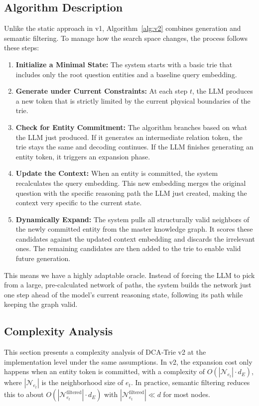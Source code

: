 \subsection{Algorithm Description}

Unlike the static approach in v1, Algorithm~\ref{alg:v2} combines generation and semantic filtering. To manage how the search space changes, the process follows these steps:

\begin{enumerate}
  \item \textbf{Initialize a Minimal State:} The system starts with a basic trie that includes only the root question entities and a baseline query embedding.
  \item \textbf{Generate under Current Constraints:} At each step $t$, the LLM produces a new token that is strictly limited by the current physical boundaries of the trie.
  \item \textbf{Check for Entity Commitment:} The algorithm branches based on what the LLM just produced. If it generates an intermediate relation token, the trie stays the same and decoding continues. If the LLM finishes generating an entity token, it triggers an expansion phase.
  \item \textbf{Update the Context:} When an entity is committed, the system recalculates the query embedding. This new embedding merges the original question with the specific reasoning path the LLM just created, making the context very specific to the current state.
  \item \textbf{Dynamically Expand:} The system pulls all structurally valid neighbors of the newly committed entity from the master knowledge graph. It scores these candidates against the updated context embedding and discards the irrelevant ones. The remaining candidates are then added to the trie to enable valid future generation.
\end{enumerate}

This means we have a highly adaptable oracle. Instead of forcing the LLM to pick from a large, pre-calculated network of paths, the system builds the network just one step ahead of the model's current reasoning state, following its path while keeping the graph valid.

\subsection{Complexity Analysis}

This section presents a complexity analysis of DCA‑Trie v2 at the implementation level under the same assumptions. In v2, the expansion cost only happens when an entity token is committed, with a complexity of $O(|\mathcal{N}_{e_t}| \cdot d_E)$, where $|\mathcal{N}_{e_t}|$ is the neighborhood size of $e_t$. In practice, semantic filtering reduces this to about $O(|\mathcal{N}_{e_t}^{\text{filtered}}| \cdot d_E)$ with $|\mathcal{N}_{e_t}^{\text{filtered}}| \ll d$ for most nodes.

